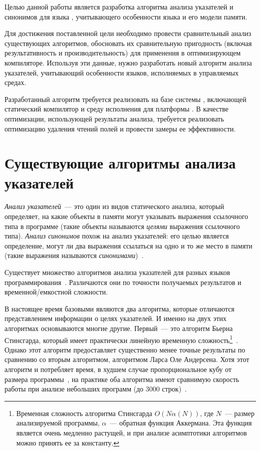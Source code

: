\documentclass[14pt,titlepage,draft]{extarticle}
\newcommand{\java}{\eng{Java}\xspace}
\begin{document}
    Целью данной работы является разработка алгоритма анализа указателей и
    синонимов для языка \java, учитывающего особенности языка и его модели
    памяти.

    Для достижения поставленной цели необходимо провести сравнительный анализ
    существующих алгоритмов, обосновать их сравнительную пригодность (включая
    результативность и производительность) для применения в оптимизирующем
    компиляторе. Используя эти данные, нужно разработать новый алгоритм анализа
    указателей, учитывающий особенности языков, исполняемых в управляемых
    средах.

    Разработанный алгоритм требуется реализовать на базе системы , включающей статический компилятор и среду
    исполнения для платформы .
    В качестве оптимизации, использующей результаты анализа, требуется
    реализовать оптимизацию удаления чтений полей и провести замеры ее
    эффективности.

  \section{Существующие алгоритмы анализа указателей}

    \emph{Анализ указателей}~--- это один из видов статического анализа,
    который определяет, на какие объекты в памяти могут указывать выражения
    ссылочного типа в программе (такие объекты называются \emph{целями} выражения
    ссылочного типа). \emph{Анализ синонимов} похож на анализ указателей: его
    целью является определение, могут ли два выражения ссылаться на одно и то
    же место в памяти (такие выражения называются
    \emph{синонимами})~\cite{andersen}.

    Существует множество алгоритмов анализа указателей для разных языков
    программирования~\cite{hind_pointer_analysis_not_solved_yet}. Различаются
    они по точности получаемых результатов и временной\slash{}емкостной
    сложности.

    В настоящее время базовыми являются два алгоритма, которые отличаются
    представлением информации о целях указателей. И именно на двух этих
    алгоритмах основываются многие другие.
    Первый~--- это алгоритм Бьерна Стинсгарда, который имеет
    практически линейную временную сложность\footnote{
      Временная сложность алгоритма Стинсгарда
      $O(N \alpha(N))$, где $N$~--- размер анализируемой программы,
      $\alpha$~--- обратная функция Аккермана. Эта функция является очень медленно
      растущей, и при анализе асимптотики алгоритмов можно принять ее за
      константу.
    }~\cite{steensgaard}. Однако этот алгоритм предоставляет существенно менее
    точные результаты по сравнению со вторым алгоритмом, алгоритмом Ларса Оле
    Андерсена. Хотя этот алгоритм и потребляет время, в худшем случае
    пропорциональное кубу от размера программы~\cite{andersen}, на практике оба
    алгоритма имеют сравнимую скорость работы при анализе небольших программ
    (до \num{3000} строк)~\cite{shapiro_fast_and_accurate}.
\end{document}
